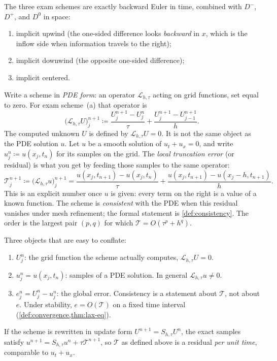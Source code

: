 \documentclass[11pt,a4paper]{article}
\begin{document}
The three exam schemes are exactly backward Euler in time, combined with \(D^-\), \(D^+\), and \(D^0\) in space:
\begin{enumerate}[label=(\alph*)]
    \item implicit upwind (the one-sided difference looks \emph{backward} in \(x\), which is the inflow side when information travels to the right);
    \item implicit downwind (the opposite one-sided difference);
    \item implicit centered.
\end{enumerate}

\begin{definition}
\label{def:truncation}
Write a scheme in \emph{PDE form}: an operator \(\mathcal L_{h,\tau}\) acting on grid functions, set equal to zero. For exam scheme~(a) that operator is
\[
\bigl(\mathcal L_{h,\tau} U\bigr)_j^{n+1}
\coloneqq
\frac{U_j^{n+1}-U_j^n}{\tau}
+
\frac{U_j^{n+1}-U_{j-1}^{n+1}}{h}.
\]
The computed unknown \(U\) is defined by \(\mathcal L_{h,\tau}U=0\). It is not the same object as the PDE solution \(u\). Let \(u\) be a smooth solution of \(u_t+u_x=0\), and write \(u_j^n\coloneqq u(x_j,t_n)\) for its samples on the grid. The \emph{local truncation error} (or residual) is what you get by feeding those samples to the same operator:
\[
\mathcal T_j^{n+1}
\coloneqq
\bigl(\mathcal L_{h,\tau} u\bigr)_j^{n+1}
=
\frac{u(x_j,t_{n+1})-u(x_j,t_n)}{\tau}
+
\frac{u(x_j,t_{n+1})-u(x_j-h,t_{n+1})}{h}.
\]
This is an explicit number once \(u\) is given: every term on the right is a value of a known function. The scheme is \emph{consistent} with the PDE when this residual vanishes under mesh refinement; the formal statement is \cref{def:consistency}. The order is the largest pair \((p,q)\) for which \(\mathcal T=O(\tau^p+h^q)\).

Three objects that are easy to conflate:
\begin{enumerate}[label=\textup{(\roman*)}]
    \item \(U_j^n\): the grid function the scheme actually computes, \(\mathcal L_{h,\tau}U=0\).
    \item \(u_j^n=u(x_j,t_n)\): samples of a PDE solution. In general \(\mathcal L_{h,\tau}u\neq 0\).
    \item \(e_j^n=U_j^n-u_j^n\): the global error. Consistency is a statement about \(\mathcal T\), not about \(e\). Under stability, \(e=O(\mathcal T)\) on a fixed time interval (\cref{def:convergence,thm:lax-eq}).
\end{enumerate}
If the scheme is rewritten in update form \(U^{n+1}=S_{h,\tau}U^n\), the exact samples satisfy \(u^{n+1}=S_{h,\tau}u^n+\tau\mathcal T^{n+1}\), so \(\mathcal T\) as defined above is a residual \emph{per unit time}, comparable to \(u_t+u_x\).
\end{definition}
\end{document}
